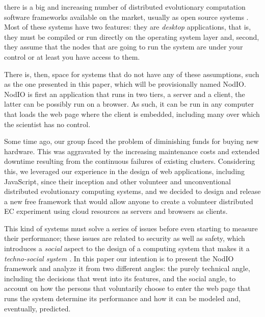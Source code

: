 \documentclass[journal,onecolumn]{IEEEtran}
\begin{document}
 there is a big and increasing number of
distributed evolutionary computation software frameworks available on
the market, usually as open source systems \cite{Parejo12Survey}. Most of these systems have %
two features: they are {\em desktop} applications, that is, they must
be compiled or run directly on the operating system layer and, second,
they assume that the nodes that are going to run the system are under
your control or at least you have access to them.

There is, then, space for systems that do not have any of these 
assumptions, such as the one presented in this paper, which will be
provisionally named {\sf NodIO}. NodIO is first an application that
runs in two tiers, a server and a client, the latter  can be possibly
run on a  %
browser. As such, it can be run in any computer that loads the web
page where the client is embedded, including many over which%
the scientist has no control. 

Some time ago, our group faced the problem of diminishing funds for
buying new     %
hardware. This was aggravated by the increasing maintenance costs and
extended downtime resulting from the continuous failures of existing
clusters.  
Considering this, we leveraged our experience in the design of web
applications, including JavaScript, since their inception and other
volunteer and 
unconventional distributed evolutionary computing systems, and we 
decided to design and release a new free framework that would allow anyone to
create a volunteer distributed EC experiment using cloud resources as
servers and browsers as clients.

This kind of systems must solve a series of issues before even starting to %
measure their performance; these issues are related to security as well as
safety, which introduces a {\em social} aspect to the design of a
computing system that makes it a {\em techno-social system}
\cite{vespignani2009predicting}. In this paper our intention is to
present the {\sf NodIO} framework and analyze it from two different
angles: the purely technical angle, including the decisions that went
into its features, and the social angle, to account on how the persons
that voluntarily choose to enter the web page that runs the system
determine its performance and how it can be modeled and, eventually,
predicted. 
\end{document}
